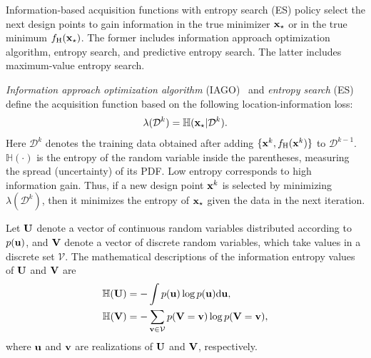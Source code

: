 \documentclass[journal ]{new-aiaa}
\begin{document}
	Information-based acquisition functions with entropy search (ES) policy select the next design points to gain information in the true minimizer ${\bf x}_\star$ or in the true minimum $f_\text{H}({\bf x}_\star)$.
	The former includes information approach optimization algorithm, entropy search, and predictive entropy search.
	The latter includes maximum-value entropy search.
	
	\textit{Information approach optimization algorithm} (IAGO)~\citep{Villemonteix2009} and \textit{entropy search} (ES)~\citep{Hennig2012} define the acquisition function based on the following location-information loss:
	\begin{equation}\label{eqn43}
		\lambda(\mathcal{D}^{k}) = \mathbb{H}({\bf x}_\star|\mathcal{D}^{k}).
	\end{equation}
	Here $\mathcal{D}^{k}$ denotes the training data obtained after adding $\{{\bf x}^k,f_\text{H}({\bf x}^k)\}$ to $\mathcal{D}^{k-1}$.
	$\mathbb{H}(\cdot)$ is the entropy of the random variable inside the parentheses, measuring the spread (uncertainty) of its PDF.
	Low entropy corresponds to high information gain.
	Thus, if a new design point ${\bf x}^k$ is selected by minimizing $\lambda(\mathcal{D}^{k})$, then it minimizes the entropy of ${\bf x}_\star$ given the data in the next iteration. 
	
	Let ${\bf U}$ denote a vector of continuous random variables distributed according to $p({\bf u})$, and ${\bf V}$ denote a vector of discrete random variables, which take values in a discrete set $\mathcal{V}$.
	The mathematical descriptions of the information entropy values of ${\bf U}$ and ${\bf V}$ are 
	\begin{subequations}\label{eqn44}
		\begin{align}
			\mathbb{H}({\bf U})& =-\int p({\bf u}) \log{p({\bf u})} \text{d}{\bf u}
			\label{eqn44-1},\\
			\mathbb{H}({\bf V}) & = -\sum_{{\bf v} \in \mathcal{V}}p({\bf V}={\bf v}) \log{p({\bf V}={\bf v})}
			\label{eqn44-2},
		\end{align}
	\end{subequations}
	where ${\bf u}$ and ${\bf v}$ are realizations of ${\bf U}$ and ${\bf V}$, respectively.
	
\end{document}
